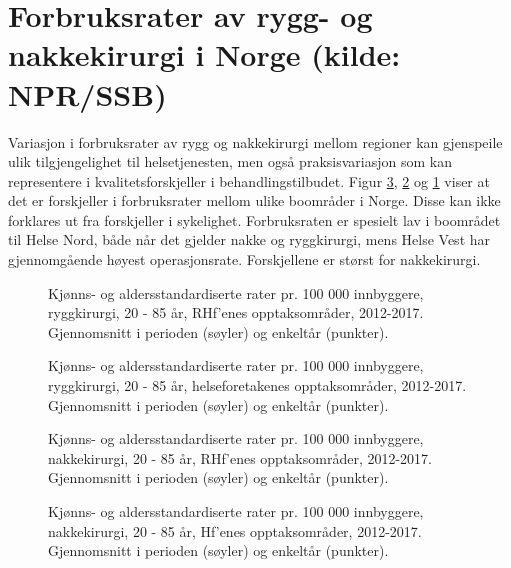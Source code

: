 \documentclass [norsk,a4paper,twoside]{article}\usepackage[]{graphicx}\usepackage[]{color}
\begin{document}
\section{Forbruksrater av rygg- og nakkekirurgi i Norge (kilde: NPR/SSB)}
Variasjon i forbruksrater av rygg og nakkekirurgi mellom regioner kan 
gjenspeile ulik tilgjengelighet til helsetjenesten, men også praksisvariasjon som kan
representere i kvalitetsforskjeller i behandlingstilbudet. Figur \ref{fig:AA_Nakkekirurgi_BoRHF1}, \ref{fig:AA_Ryggkirurgi_BoHF1} og \ref{fig:AA_Ryggkirurgi_BoRHF1} viser at det
er forskjeller i forbruksrater mellom ulike boområder i Norge. Disse kan ikke
forklares ut fra forskjeller i sykelighet. Forbruksraten er spesielt lav i boområdet til
Helse Nord, både når det gjelder nakke og ryggkirurgi, mens Helse Vest har gjennomgående høyest operasjonsrate. Forskjellene er størst for nakkekirurgi.

\begin{figure}[ht]
\caption{Kjønns- og aldersstandardiserte rater pr. 100 000 innbyggere, ryggkirurgi, 20 - 85 år, RHf’enes opptaksområder, 2012-2017. Gjennomsnitt i perioden (søyler) og enkeltår (punkter).}
\label{fig:AA_Ryggkirurgi_BoRHF1}
\end{figure}

\begin{figure}[ht]
\caption{Kjønns- og aldersstandardiserte rater pr. 100 000 innbyggere, ryggkirurgi, 20 - 85 år, helseforetakenes opptaksområder, 2012-2017. Gjennomsnitt i perioden (søyler) og enkeltår (punkter).}
\label{fig:AA_Ryggkirurgi_BoHF1}
\end{figure}


\begin{figure}[ht]
\caption{Kjønns- og aldersstandardiserte rater pr. 100 000 innbyggere, nakkekirurgi, 20 - 85 år, RHf’enes opptaksområder, 2012-2017. Gjennomsnitt i perioden (søyler) og enkeltår (punkter).}
\label{fig:AA_Nakkekirurgi_BoRHF1}
\end{figure}

\begin{figure}[ht]
\caption{Kjønns- og aldersstandardiserte rater pr. 100 000 innbyggere, nakkekirurgi, 20 - 85 år, Hf’enes opptaksområder, 2012-2017. Gjennomsnitt i perioden (søyler) og enkeltår (punkter).}
\label{fig:AA_Nakkekirurgi_BoHF1}
\end{figure}
\end{document}
